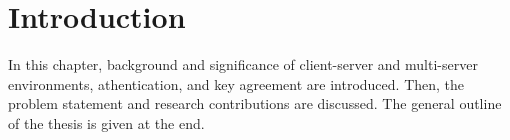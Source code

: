 \chapter{Introduction}\label{chater:intro}
In this chapter, background and significance of client-server and multi-server environments, athentication, and key agreement are introduced. Then, the problem statement and research contributions are discussed. The general outline of the thesis is given at the  end.
